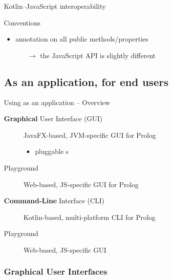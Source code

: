 \documentclass[handout]{beamer}
\begin{document}
\begin{frame}[allowframebreaks]{Kotlin--JavaScript interoperability}

    \begin{exampleblock}{\twopkt{} Conventions}
        \begin{itemize}
            \item {} annotation on all public methods/properties
            \begin{itemize}
                \item[$\rightarrow$] the JavaScript API is slightly different
            \end{itemize}
        \end{itemize}
    \end{exampleblock}
\end{frame}

\subsection{As an application, for end users}

\begin{frame}{Using \twopkt{} as an application -- Overview}
    \begin{block}{\textbf{Graphical} User Interface (GUI)}
        \begin{description}
            \item[] JavaFX-based, JVM-specific GUI for Prolog
            \begin{itemize}
                \item pluggable s
            \end{itemize} 
            \item[Playground] Web-based, JS-specific GUI for Prolog
        \end{description}
    \end{block}

    \begin{block}{\textbf{Command-Line} Interface (CLI)}
        \begin{description}
            \item[] Kotlin-based, multi-platform CLI for Prolog
            \item[Playground] Web-based, JS-specific GUI 
        \end{description}
    \end{block}
\end{frame}

\subsubsection{Graphical User Interfaces}
\end{document}
